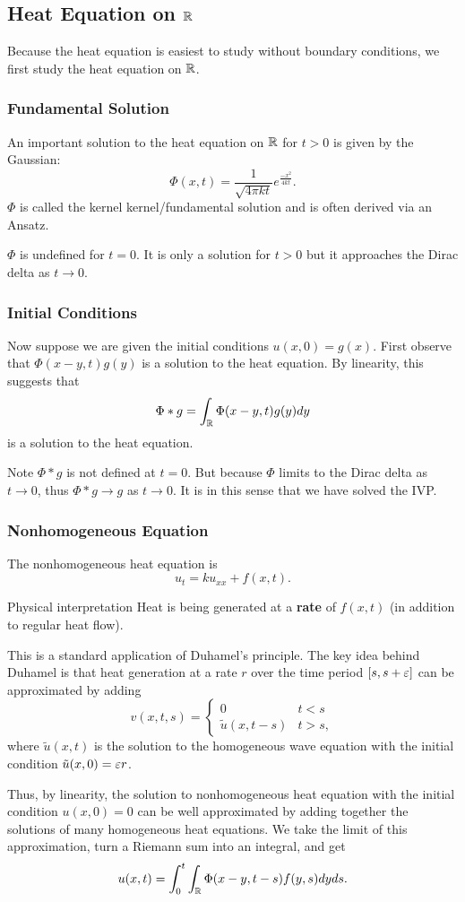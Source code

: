 \subsection{Heat Equation on ${\mathbb R}$}
Because the heat equation is easiest to study without boundary conditions, we first study the heat equation on ${\mathbb R}$.
\subsubsection{Fundamental Solution}
An important solution to the heat equation on ${\mathbb R}$ for $t > 0$ is given by the Gaussian:
\[
    \Phi(x,t) = \frac{1}{\sqrt{4\pi kt}}e^{ \frac{-x^2}{4kt}}.
\]
$\Phi$ is called the kernel kernel/fundamental solution and is often derived via an Ansatz.
\begin{remark}
    $\Phi$ is undefined for $t = 0$. It is only a solution for $t > 0$ but it approaches the Dirac delta as $t \rightarrow 0$.
\end{remark}
\subsubsection{Initial Conditions}
Now suppose we are given the initial conditions $u(x,0) = g(x)$. First observe that $\Phi(x-y,t)g(y)$ is a solution to the heat equation. By linearity, this suggests that
\[
    \Phi * g = \int_{\mathbb R} \Phi(x-y,t)g(y) dy
\]
is a solution to the heat equation.

Note $\Phi * g$ is not defined at $t = 0$. But because $\Phi$ limits to the Dirac delta as $t \rightarrow 0$, thus $\Phi * g \rightarrow g$ as $t \rightarrow 0$. It is in this sense that we have solved the IVP.

\subsubsection{Nonhomogeneous Equation}
The nonhomogeneous heat equation is
\[
    u_t = ku_{xx} + f(x,t).
\]
\begin{details}{Physical interpretation}
    Heat is being generated at a \textbf{rate} of $f(x,t)$ (in addition to regular heat flow).
\end{details}
This is a standard application of Duhamel's principle. The key idea behind Duhamel is that heat generation at a rate $r$ over the time period $[s,s+\varepsilon]$ can be approximated by adding
\[
    v(x,t,s) =
    \begin{cases}
        0   &   t < s\\
        \tilde{u}(x,t-s) & t > s,
    \end{cases}
\]
where $\tilde{u}(x,t)$ is the solution to the homogeneous wave equation with the initial condition $\tilde{u}(x,0) = \varepsilon r$. 

Thus, by linearity, the solution to nonhomogeneous heat equation with the initial condition $u(x,0) = 0$ can be well approximated by adding together the solutions of many homogeneous heat equations. We take the limit of this approximation, turn a Riemann sum into an integral, and get
\[
    u(x,t) = \int_0^t \int_{\mathbb R} \Phi(x - y, t-s)f(y,s)dyds.
\]
